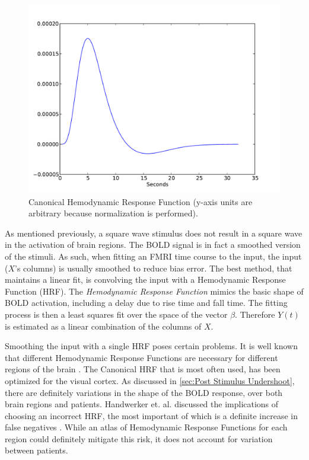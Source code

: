 \begin{figure}
\centering
\includegraphics[scale=.7]{images/HRF}
\caption{Canonical Hemodynamic Response Function (y-axis units are arbitrary because 
normalization is performed).}
\label{fig:HRF}
\end{figure}

As mentioned previously, a square wave stimulus 
does not result in a square wave in the activation of brain regions. 
The BOLD signal is in fact a smoothed version of the 
stimuli. As such, when fitting an FMRI time course to the input,
the input ($X$'s columns) is usually smoothed to reduce bias error. 
The best method, that maintains a linear fit, is convolving the input 
with a Hemodynamic 
Response Function (HRF). The \emph{Hemodynamic Response Function}
mimics the basic shape of BOLD activation, including a delay
due to rise time and fall time. The fitting 
process is then a least squares fit over the space of the vector $\beta$. 
Therefore $Y(t)$ is estimated as a linear combination 
of the columns of $X$. 

Smoothing the input with a single HRF poses certain problems.
It is well known that different Hemodynamic Response Functions are necessary 
for different regions of the brain \cite{Handwerker2004}. The Canonical HRF that is most often used, 
has been optimized for the visual cortex. As discussed in \autoref{sec:Post Stimulus Undershoot},
there are definitely variations in the shape of the
BOLD response, over both brain regions and patients. Handwerker et. al. 
discussed the implications of choosing an incorrect HRF, the most important
of which is a definite increase in false negatives \cite{Handwerker2004}. While an atlas
of Hemodynamic Response Functions for each region could definitely 
mitigate this risk, it does not account for variation between patients.

